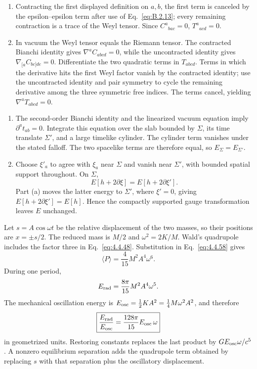 \begin{enumerate}[leftmargin=2.8em,itemsep=1.2em]
\begin{enumerate}[label=\alph*),leftmargin=2em]
\item Contracting the first displayed definition on \(a,b\), the first term
is canceled by the epsilon--epsilon term after use of
Eq.~\eqref{eq:B.2.13}; every remaining contraction is a trace of the Weyl
tensor.  Since \(C^a{}_{bac}=0\),
\(T^a{}_{acd}=0\).

\item In vacuum the Weyl tensor equals the Riemann tensor.  The contracted
Bianchi identity gives
\(\nabla^aC_{abcd}=0\), while the uncontracted identity gives
\(\nabla_{[a}C_{bc]de}=0\).  Differentiate the two quadratic terms in
\(T_{abcd}\).  Terms in which the derivative hits the first Weyl factor
vanish by the contracted identity; use the uncontracted identity and pair
symmetry to cycle the remaining derivative among the three symmetric free
indices.  The terms cancel, yielding
\(\nabla^aT_{abcd}=0\).
\end{enumerate}

\begin{enumerate}[label=\alph*),leftmargin=2em]
\item The second-order Bianchi identity and the linearized vacuum equation
imply \(\partial^at_{ab}=0\).  Integrate this equation over the slab bounded
by \(\Sigma\), its time translate \(\Sigma'\), and a large timelike cylinder.
The cylinder term vanishes under the stated falloff.  The two spacelike terms
are therefore equal, so \(E_\Sigma=E_{\Sigma'}\).

\item Choose \(\xi'_a\) to agree with \(\xi_a\) near \(\Sigma\) and vanish
near \(\Sigma'\), with bounded spatial support throughout.  On \(\Sigma\),
\[
 E[h+2\partial\xi]=E[h+2\partial\xi'].
\]
Part (a) moves the latter energy to \(\Sigma'\), where \(\xi'=0\), giving
\(E[h+2\partial\xi']=E[h]\).  Hence the compactly supported gauge
transformation leaves \(E\) unchanged.
\end{enumerate}

Let \(s=A\cos\omega t\) be the relative displacement of the two masses, so
their positions are \(x=\pm s/2\).  The reduced mass is \(M/2\) and
\(\omega^2=2K/M\).  Wald's quadrupole includes the factor three in
Eq.~\eqref{eq:4.4.48}.  Substitution in Eq.~\eqref{eq:4.4.58} gives
\[
 \langle P\rangle=\frac{4}{15}M^2A^4\omega^6.
\]
During one period,
\[
 E_{\rm rad}=\frac{8\pi}{15}M^2A^4\omega^5.
\]
The mechanical oscillation energy is
\(E_{\rm osc}=\tfrac12KA^2=\tfrac14M\omega^2A^2\), and therefore
\[
 \boxed{\frac{E_{\rm rad}}{E_{\rm osc}}
 =\frac{128\pi}{15}E_{\rm osc}\,\omega}
\]
in geometrized units.  Restoring constants replaces the last product by
\(G E_{\rm osc}\omega/c^5\).  A nonzero equilibrium separation adds the
quadrupole term obtained by replacing \(s\) with that separation plus the
oscillatory displacement.


\end{enumerate}
